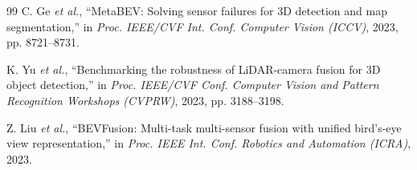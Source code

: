 \documentclass[letterpaper, 10 pt, conference]{ieeeconf}
\begin{document}
\begin{thebibliography}{99}
 C. Ge \emph{et al.}, ``MetaBEV: Solving sensor failures for 3D detection and map segmentation,'' in \emph{Proc. IEEE/CVF Int. Conf. Computer Vision (ICCV)}, 2023, pp. 8721--8731.

 K. Yu \emph{et al.}, ``Benchmarking the robustness of LiDAR-camera fusion for 3D object detection,'' in \emph{Proc. IEEE/CVF Conf. Computer Vision and Pattern Recognition Workshops (CVPRW)}, 2023, pp. 3188--3198.

 Z. Liu \emph{et al.}, ``BEVFusion: Multi-task multi-sensor fusion with unified bird's-eye view representation,'' in \emph{Proc. IEEE Int. Conf. Robotics and Automation (ICRA)}, 2023.

\end{thebibliography}
\end{document}
